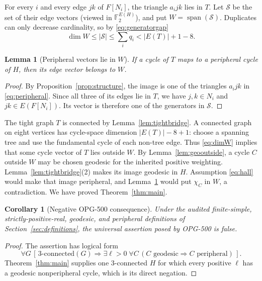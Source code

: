 \documentclass[11pt]{amsart}
\newtheorem{lemma}[theorem]{Lemma}
\newtheorem{corollary}[theorem]{Corollary}
\theoremstyle{definition}
\newcommand{\Ftwo}{\mathbb{F}_2}
\begin{document}
For every $i$ and every edge $jk$ of $F[N_i]$, the triangle $a_i j k$ lies in $T$.  Let $\mathcal S$ be the set of their edge vectors (viewed in $\Ftwo^{E(H)}$), and put $W=\operatorname{span}(\mathcal S)$.  Duplicates can only decrease cardinality, so by \eqref{eq:generatorgap}
\begin{equation}\label{eq:dimW}
 \dim W\le |\mathcal S|\le\sum_i q_i<|E(T)|+1-8.
\end{equation}

\begin{lemma}[Peripheral vectors lie in $W$]\label{lem:peripheralspan}
If a cycle of $T$ maps to a peripheral cycle of $H$, then its edge vector belongs to $W$.
\end{lemma}

\begin{proof}
By Proposition~\ref{prop:structure}, the image is one of the triangles $a_i j k$ in \eqref{eq:peripheral}.  Since all three of its edges lie in $T$, we have $j,k\in N_i$ and $jk\in E(F[N_i])$.  Its vector is therefore one of the generators in $\mathcal S$.
\end{proof}

The tight graph $T$ is connected by Lemma~\ref{lem:tightbridge}.  A connected graph on eight vertices has cycle-space dimension $|E(T)|-8+1$: choose a spanning tree and use the fundamental cycle of each non-tree edge.  Thus \eqref{eq:dimW} implies that some cycle vector of $T$ lies outside $W$.  By Lemma~\ref{lem:geooutside}, a cycle $C$ outside $W$ may be chosen geodesic for the inherited positive weighting.  Lemma~\ref{lem:tightbridge}(2) makes its image geodesic in $H$.  Assumption \eqref{eq:hall} would make that image peripheral, and Lemma~\ref{lem:peripheralspan} would put $\chi_C$ in $W$, a contradiction.  We have proved Theorem~\ref{thm:main}.

\begin{corollary}[Negative OPG-500 consequence]\label{cor:negative}
Under the audited finite-simple, strictly-positive-real, geodesic, and peripheral definitions of Section~\ref{sec:definitions}, the universal assertion posed by OPG-500 is false.
\end{corollary}

\begin{proof}
The assertion has logical form
\[
 \forall G\,[\,3\text{-connected}(G)\Rightarrow
   \exists\ell>0\;\forall C\,(C\text{ geodesic}\Rightarrow C\text{ peripheral})\,].
\]
Theorem~\ref{thm:main} supplies one $3$-connected $H$ for which every positive $\ell$ has a geodesic nonperipheral cycle, which is its direct negation.
\end{proof}
\end{document}
